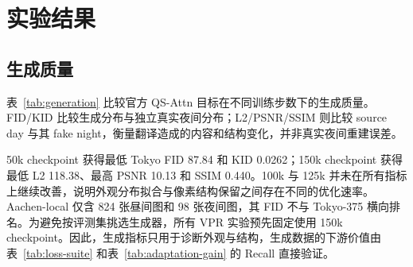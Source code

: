 \documentclass[UTF8,a4paper,11pt]{ctexart}
\begin{document}
\section{实验结果}
\subsection{生成质量}
表~\ref{tab:generation} 比较官方 QS-Attn 目标在不同训练步数下的生成质量。FID/KID 比较生成分布与独立真实夜间分布；L2/PSNR/SSIM 则比较 source day 与其 fake night，衡量翻译造成的内容和结构变化，并非真实夜间重建误差。
\begin{table}[htbp]
\centering
\caption{官方 QS-Attn 目标的生成质量。L2/PSNR/SSIM 为 source--fake 指标；50k--150k 使用 Tokyo-375，Aachen-local 单独列出。}
\label{tab:generation}
\end{table}

50k checkpoint 获得最低 Tokyo FID 87.84 和 KID 0.0262；150k checkpoint 获得最低 L2 118.38、最高 PSNR 10.13 和 SSIM 0.440。100k 与 125k 并未在所有指标上继续改善，说明外观分布拟合与像素结构保留之间存在不同的优化速率。Aachen-local 仅含 824 张昼间图和 98 张夜间图，其 FID 不与 Tokyo-375 横向排名。为避免按评测集挑选生成器，所有 VPR 实验预先固定使用 150k checkpoint。因此，生成指标只用于诊断外观与结构，生成数据的下游价值由表~\ref{tab:loss-suite} 和表~\ref{tab:adaptation-gain} 的 Recall 直接验证。
\end{document}
